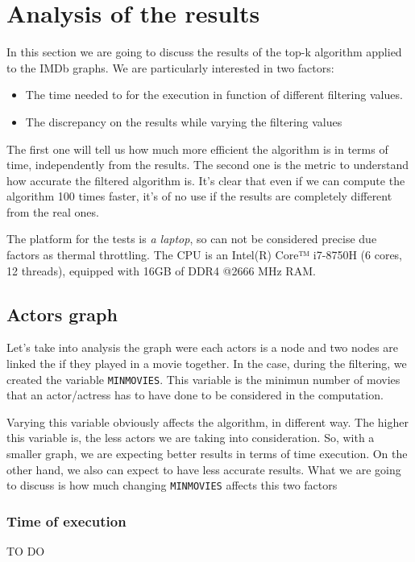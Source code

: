 \section{Analysis of the results}
In this section we are going to discuss the results of the top-k algorithm applied to the IMDb graphs. We are particularly interested in two factors:
\begin{itemize}
    \item The time needed to for the execution in function of different filtering values.
    \item The discrepancy on the results while varying the filtering values
\end{itemize}
The first one will tell us how much more efficient the algorithm is in terms of time, independently from the results. The second one is the metric to understand how accurate the filtered algorithm is. It's clear that even if we can compute the algorithm 100 times faster, it's of no use if the results are completely different from the real ones.\s

\nd The platform for the tests is \emph{a laptop}, so can not be considered precise due factors as thermal throttling. The CPU is an Intel(R) Core™ i7-8750H (6 cores, 12 threads), equipped with 16GB of DDR4 @2666 MHz RAM.

\subsection{Actors graph}
Let's take into analysis the graph were each actors is a node and two nodes are linked the if they played in a movie together. In the case, during the filtering, we created the variable \texttt{MINMOVIES}. This variable is the minimun number of movies that an actor/actress has to have done to be considered in the computation.

Varying this variable obviously affects the algorithm, in different way. The higher this variable is, the less actors we are taking into consideration. So, with a smaller graph, we are expecting better results in terms of time execution. On the other hand, we also can expect to have less accurate results. What we are going to discuss is how much changing \texttt{MINMOVIES} affects this two factors

\subsubsection{Time of execution}

TO DO

